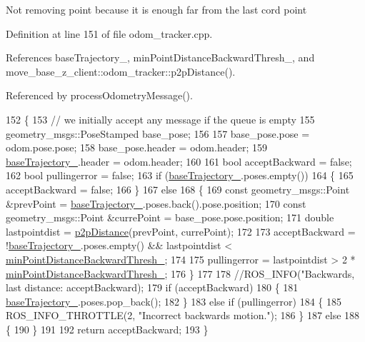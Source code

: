 Not removing point because it is enough far from the last cord point 

Definition at line 151 of file odom\+\_\+tracker.\+cpp.



References base\+Trajectory\+\_\+, min\+Point\+Distance\+Backward\+Thresh\+\_\+, and move\+\_\+base\+\_\+z\+\_\+client\+::odom\+\_\+tracker\+::p2p\+Distance().



Referenced by process\+Odometry\+Message().


\begin{DoxyCode}
152 \{
153     \textcolor{comment}{// we initially accept any message if the queue is empty}
155 \textcolor{comment}{}    geometry\_msgs::PoseStamped base\_pose;
156 
157     base\_pose.pose = odom.pose.pose;
158     base\_pose.header = odom.header;
159     \hyperlink{classmove__base__z__client_1_1odom__tracker_1_1OdomTracker_a83fa5a9bfe0b2683eee33444d3f030ea}{baseTrajectory\_}.header = odom.header;
160 
161     \textcolor{keywordtype}{bool} acceptBackward = \textcolor{keyword}{false};
162     \textcolor{keywordtype}{bool} pullingerror = \textcolor{keyword}{false};
163     \textcolor{keywordflow}{if} (\hyperlink{classmove__base__z__client_1_1odom__tracker_1_1OdomTracker_a83fa5a9bfe0b2683eee33444d3f030ea}{baseTrajectory\_}.poses.empty())
164     \{
165         acceptBackward = \textcolor{keyword}{false};
166     \}
167     \textcolor{keywordflow}{else}
168     \{
169         \textcolor{keyword}{const} geometry\_msgs::Point &prevPoint = \hyperlink{classmove__base__z__client_1_1odom__tracker_1_1OdomTracker_a83fa5a9bfe0b2683eee33444d3f030ea}{baseTrajectory\_}.poses.back().pose.position;
170         \textcolor{keyword}{const} geometry\_msgs::Point &currePoint = base\_pose.pose.position;
171         \textcolor{keywordtype}{double} lastpointdist = \hyperlink{namespacemove__base__z__client_1_1odom__tracker_a4437fd4b6bf9ca87f5b806ad408fb430}{p2pDistance}(prevPoint, currePoint);
172 
173         acceptBackward = !\hyperlink{classmove__base__z__client_1_1odom__tracker_1_1OdomTracker_a83fa5a9bfe0b2683eee33444d3f030ea}{baseTrajectory\_}.poses.empty() && lastpointdist < 
      \hyperlink{classmove__base__z__client_1_1odom__tracker_1_1OdomTracker_afdcfc389baa89c5583bf32bf5fdc7e16}{minPointDistanceBackwardThresh\_};
174 
175         pullingerror = lastpointdist > 2 * \hyperlink{classmove__base__z__client_1_1odom__tracker_1_1OdomTracker_afdcfc389baa89c5583bf32bf5fdc7e16}{minPointDistanceBackwardThresh\_};
176     \}
177 
178     \textcolor{comment}{//ROS\_INFO("Backwards, last distance: %
       acceptBackward);}
179     \textcolor{keywordflow}{if} (acceptBackward)
180     \{
181         \hyperlink{classmove__base__z__client_1_1odom__tracker_1_1OdomTracker_a83fa5a9bfe0b2683eee33444d3f030ea}{baseTrajectory\_}.poses.pop\_back();
182     \}
183     \textcolor{keywordflow}{else} \textcolor{keywordflow}{if} (pullingerror)
184     \{
185         ROS\_INFO\_THROTTLE(2, \textcolor{stringliteral}{"Incorrect backwards motion."});
186     \}
187     \textcolor{keywordflow}{else}
188     \{
190     \}
191 
192     \textcolor{keywordflow}{return} acceptBackward;
193 \}
\end{DoxyCode}


